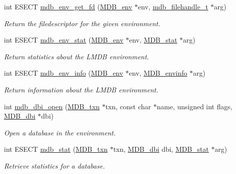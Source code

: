 \begin{DoxyCompactItemize}
int E\+S\+E\+CT \mbox{\hyperlink{group__internal_ga12687c54a5947c91b24037e32c1d9666}{mdb\+\_\+env\+\_\+get\+\_\+fd}} (\mbox{\hyperlink{struct_m_d_b__env}{M\+D\+B\+\_\+env}} $\ast$env, \mbox{\hyperlink{lmdb_8h_a6799f2853adc2e3b863dc2e6d9d0064f}{mdb\+\_\+filehandle\+\_\+t}} $\ast$arg)
\begin{DoxyCompactList}\small\item\em Return the filedescriptor for the given environment. \end{DoxyCompactList}\item 
int E\+S\+E\+CT \mbox{\hyperlink{group__internal_ga28175a862151f0bcb616901baf2b9466}{mdb\+\_\+env\+\_\+stat}} (\mbox{\hyperlink{struct_m_d_b__env}{M\+D\+B\+\_\+env}} $\ast$env, \mbox{\hyperlink{struct_m_d_b__stat}{M\+D\+B\+\_\+stat}} $\ast$arg)
\begin{DoxyCompactList}\small\item\em Return statistics about the L\+M\+DB environment. \end{DoxyCompactList}\item 
int E\+S\+E\+CT \mbox{\hyperlink{group__internal_gad39d6e172835b9667b8245aa08fe5824}{mdb\+\_\+env\+\_\+info}} (\mbox{\hyperlink{struct_m_d_b__env}{M\+D\+B\+\_\+env}} $\ast$env, \mbox{\hyperlink{struct_m_d_b__envinfo}{M\+D\+B\+\_\+envinfo}} $\ast$arg)
\begin{DoxyCompactList}\small\item\em Return information about the L\+M\+DB environment. \end{DoxyCompactList}\item 
int \mbox{\hyperlink{group__internal_gac08cad5b096925642ca359a6d6f0562a}{mdb\+\_\+dbi\+\_\+open}} (\mbox{\hyperlink{struct_m_d_b__txn}{M\+D\+B\+\_\+txn}} $\ast$txn, const char $\ast$name, unsigned int flags, \mbox{\hyperlink{group__mdb_gadbe68a06c448dfb62da16443d251a78b}{M\+D\+B\+\_\+dbi}} $\ast$dbi)
\begin{DoxyCompactList}\small\item\em Open a database in the environment. \end{DoxyCompactList}\item 
int E\+S\+E\+CT \mbox{\hyperlink{group__internal_ga8927270302d6f419669109d1ea03cc5d}{mdb\+\_\+stat}} (\mbox{\hyperlink{struct_m_d_b__txn}{M\+D\+B\+\_\+txn}} $\ast$txn, \mbox{\hyperlink{group__mdb_gadbe68a06c448dfb62da16443d251a78b}{M\+D\+B\+\_\+dbi}} dbi, \mbox{\hyperlink{struct_m_d_b__stat}{M\+D\+B\+\_\+stat}} $\ast$arg)
\begin{DoxyCompactList}\small\item\em Retrieve statistics for a database. \end{DoxyCompactList}\item 

\end{DoxyCompactItemize}
